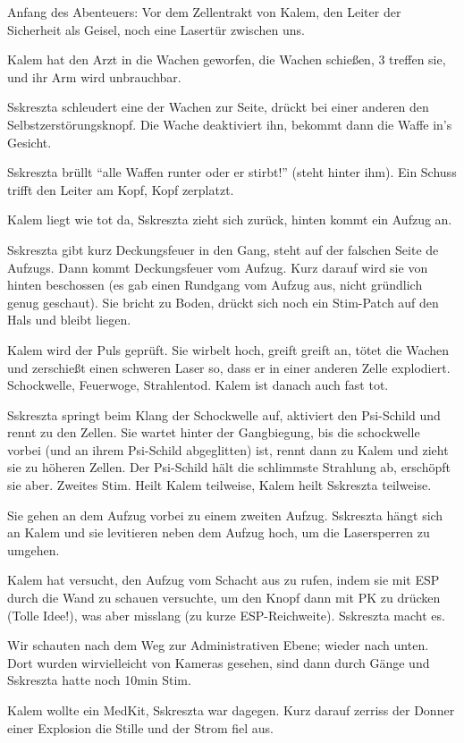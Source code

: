 \documentclass[11pt]{article}
\begin{document}
Anfang des Abenteuers: Vor dem Zellentrakt von Kalem, den Leiter der
Sicherheit als Geisel, noch eine Lasertür zwischen uns.

Kalem hat den Arzt in die Wachen geworfen, die Wachen schießen, 3
treffen sie, und ihr Arm wird unbrauchbar.

Sskreszta schleudert eine der Wachen zur Seite, drückt bei einer anderen
den Selbstzerstörungsknopf. Die Wache deaktiviert ihn, bekommt dann die
Waffe in's Gesicht.

Sskreszta brüllt ``alle Waffen runter oder er stirbt!'' (steht hinter
ihm). Ein Schuss trifft den Leiter am Kopf, Kopf zerplatzt.

Kalem liegt wie tot da, Sskreszta zieht sich zurück, hinten kommt ein
Aufzug an.

Sskreszta gibt kurz Deckungsfeuer in den Gang, steht auf der falschen
Seite de Aufzugs. Dann kommt Deckungsfeuer vom Aufzug. Kurz darauf wird
sie von hinten beschossen (es gab einen Rundgang vom Aufzug aus, nicht
gründlich genug geschaut). Sie bricht zu Boden, drückt sich noch ein
Stim-Patch auf den Hals und bleibt liegen.

Kalem wird der Puls geprüft. Sie wirbelt hoch, greift greift an, tötet
die Wachen und zerschießt einen schweren Laser so, dass er in einer
anderen Zelle explodiert. Schockwelle, Feuerwoge, Strahlentod. Kalem ist
danach auch fast tot.

Sskreszta springt beim Klang der Schockwelle auf, aktiviert den
Psi-Schild und rennt zu den Zellen. Sie wartet hinter der Gangbiegung,
bis die schockwelle vorbei (und an ihrem Psi-Schild abgeglitten) ist,
rennt dann zu Kalem und zieht sie zu höheren Zellen. Der Psi-Schild hält
die schlimmste Strahlung ab, erschöpft sie aber. Zweites Stim. Heilt
Kalem teilweise, Kalem heilt Sskreszta teilweise.

Sie gehen an dem Aufzug vorbei zu einem zweiten Aufzug. Sskreszta hängt
sich an Kalem und sie levitieren neben dem Aufzug hoch, um die
Lasersperren zu umgehen.

Kalem hat versucht, den Aufzug vom Schacht aus zu rufen, indem sie mit
ESP durch die Wand zu schauen versuchte, um den Knopf dann mit PK zu
drücken (Tolle Idee!), was aber misslang (zu kurze ESP-Reichweite).
Sskreszta macht es.

Wir schauten nach dem Weg zur Administrativen Ebene; wieder nach unten.
Dort wurden wirvielleicht von Kameras gesehen, sind dann durch Gänge und
Sskreszta hatte noch 10min Stim.

Kalem wollte ein MedKit, Sskreszta war dagegen. Kurz darauf zerriss der
Donner einer Explosion die Stille und der Strom fiel aus.
\end{document}
